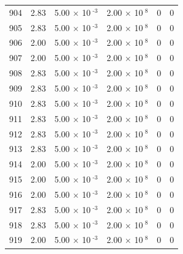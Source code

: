 \documentclass[a4paper,11pt]{article}
\begin{document}
\begin{center}
\begin{longtable}{|R{1.5cm}|R{2.4cm}|R{2.4cm}|R{2.4cm}|R{2.4cm}|R{2.4cm}|}
  904 &   2.83  &         5.00 $\times$ 10$^{\text{          -3}}$  &         2.00 $\times$ 10$^{\text{           8}}$  & 0  & 0 \\
  905 &   2.83  &         5.00 $\times$ 10$^{\text{          -3}}$  &         2.00 $\times$ 10$^{\text{           8}}$  & 0  & 0 \\
  906 &   2.00  &         5.00 $\times$ 10$^{\text{          -3}}$  &         2.00 $\times$ 10$^{\text{           8}}$  & 0  & 0 \\
  907 &   2.00  &         5.00 $\times$ 10$^{\text{          -3}}$  &         2.00 $\times$ 10$^{\text{           8}}$  & 0  & 0 \\
  908 &   2.83  &         5.00 $\times$ 10$^{\text{          -3}}$  &         2.00 $\times$ 10$^{\text{           8}}$  & 0  & 0 \\
  909 &   2.83  &         5.00 $\times$ 10$^{\text{          -3}}$  &         2.00 $\times$ 10$^{\text{           8}}$  & 0  & 0 \\
  910 &   2.83  &         5.00 $\times$ 10$^{\text{          -3}}$  &         2.00 $\times$ 10$^{\text{           8}}$  & 0  & 0 \\
  911 &   2.83  &         5.00 $\times$ 10$^{\text{          -3}}$  &         2.00 $\times$ 10$^{\text{           8}}$  & 0  & 0 \\
  912 &   2.83  &         5.00 $\times$ 10$^{\text{          -3}}$  &         2.00 $\times$ 10$^{\text{           8}}$  & 0  & 0 \\
  913 &   2.83  &         5.00 $\times$ 10$^{\text{          -3}}$  &         2.00 $\times$ 10$^{\text{           8}}$  & 0  & 0 \\
  914 &   2.00  &         5.00 $\times$ 10$^{\text{          -3}}$  &         2.00 $\times$ 10$^{\text{           8}}$  & 0  & 0 \\
  915 &   2.00  &         5.00 $\times$ 10$^{\text{          -3}}$  &         2.00 $\times$ 10$^{\text{           8}}$  & 0  & 0 \\
  916 &   2.00  &         5.00 $\times$ 10$^{\text{          -3}}$  &         2.00 $\times$ 10$^{\text{           8}}$  & 0  & 0 \\
  917 &   2.83  &         5.00 $\times$ 10$^{\text{          -3}}$  &         2.00 $\times$ 10$^{\text{           8}}$  & 0  & 0 \\
  918 &   2.83  &         5.00 $\times$ 10$^{\text{          -3}}$  &         2.00 $\times$ 10$^{\text{           8}}$  & 0  & 0 \\
  919 &   2.00  &         5.00 $\times$ 10$^{\text{          -3}}$  &         2.00 $\times$ 10$^{\text{           8}}$  & 0  & 0 \\

\end{longtable}
\end{center}
\end{document}
